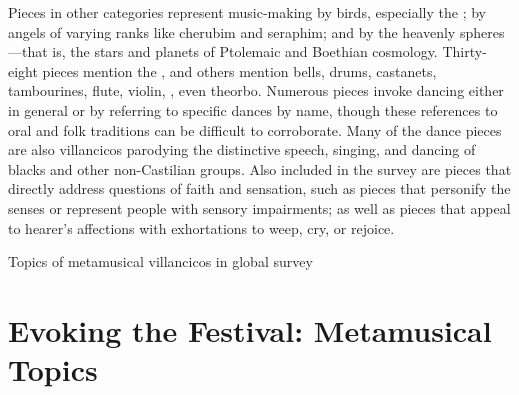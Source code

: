 Pieces in other categories represent music-making by birds, especially the ; by angels of varying ranks like cherubim and seraphim; and by the heavenly spheres---that is, the stars and planets of Ptolemaic and Boethian cosmology.
Thirty-eight pieces mention the , and others mention bells, drums, castanets, tambourines, flute, violin, , even theorbo.
Numerous pieces invoke dancing either in general or by referring to specific dances by name, though these references to oral and folk traditions can be difficult to corroborate.
Many of the dance pieces are also  villancicos parodying the distinctive speech, singing, and dancing of blacks and other non-Castilian groups.
Also included in the survey are pieces that directly address questions of faith and sensation, such as pieces that personify the senses or represent people with sensory impairments; as well as pieces that appeal to hearer's affections with exhortations to weep, cry, or rejoice.

\begin{table}
\caption{Topics of metamusical villancicos in global survey}
\label{table:metamusical-survey}
\end{table}

\section{Evoking the Festival: Metamusical Topics}

